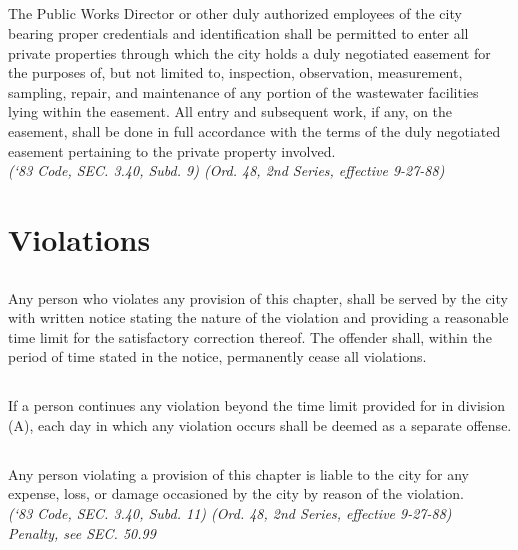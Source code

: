 \subsection{}
The Public Works Director or other duly authorized employees of the city bearing proper credentials and identification shall be permitted to enter all private properties through which the city holds a duly negotiated easement for the purposes of, but not limited to, inspection, observation, measurement, sampling, repair, and maintenance of any portion of the wastewater facilities lying within the easement.  All entry and subsequent work, if any, on the easement, shall be done in full accordance with the terms of the duly negotiated easement pertaining to the private property involved.\\
\emph{(‘83 Code, SEC. 3.40, Subd. 9) (Ord. 48, 2nd Series, effective 9-27-88)}
\section{Violations}
\subsection{}
Any person who violates any provision of this chapter, shall be served by the city with written notice stating the nature of the violation and providing a reasonable time limit for the satisfactory correction thereof.  The offender shall, within the period of time stated in the notice, permanently cease all violations.
\subsection{}
If a person continues any violation beyond the time limit provided for in division (A), each day in which any violation occurs shall be deemed as a separate offense.
\subsection{}
Any person violating a provision of this chapter is liable to the city for any expense, loss, or damage occasioned by the city by reason of the violation.\\
\emph{(‘83 Code, SEC. 3.40, Subd. 11) (Ord. 48, 2nd Series, effective 9-27-88)}\\
\emph{Penalty, see SEC. 50.99}
